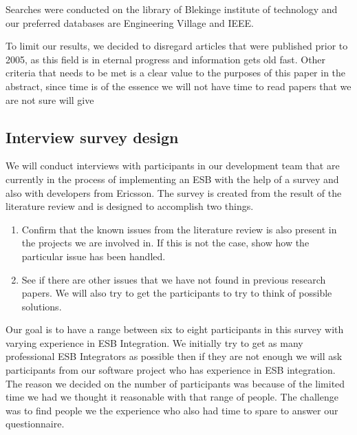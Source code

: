 \documentclass{llncs}
\begin{document}
Searches were conducted on the library of Blekinge institute of technology and our preferred databases are Engineering Village and IEEE.

To limit our results, we decided to disregard articles that were published prior to 2005, as this field is in eternal progress and information gets old fast.
Other criteria that needs to be met is a clear value to the purposes of this paper in the abstract, since time is of the essence we will not have time to read papers that we are not sure will give 

\subsection{Interview survey design}

We will conduct interviews with participants in our development team that are currently in the process of implementing an ESB with the help of a survey and also with developers from Ericsson. The survey is created from the result of the literature review and is designed to accomplish two things.
\begin{enumerate}
\item Confirm that the known issues from the literature review is also present in the projects we are involved in. If this is not the case, show how the particular issue has been handled.
\item See if there are other issues that we have not found in previous research papers. We will also try to get the participants to try to think of possible solutions.
\end{enumerate}
Our goal is to have a range between six to eight participants in this survey with varying experience in ESB Integration. We initially try to get as many professional ESB Integrators as possible then if they are not enough we will ask participants from our software project who has experience in ESB integration. The reason we decided on the number of participants was because of the limited time we had we thought it reasonable with that range of people. The challenge was to find people we the experience who also had time to spare to answer our questionnaire. 
\end{document}
